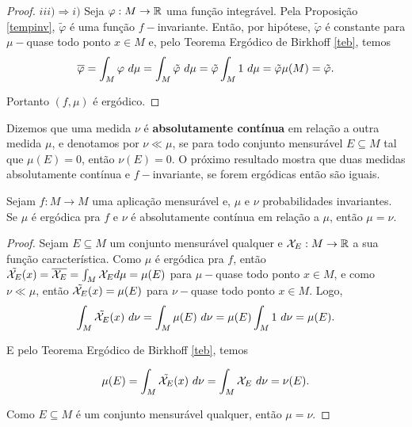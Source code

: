 \begin{proof}
$iii) \Rightarrow i)$ Seja $\varphi:M\to\mathbb{R}$ uma função integrável. Pela Proposição \ref{tempinv}, $\tilde{\varphi}$ é uma função $f-$invariante. Então, por hipótese, $\tilde{\varphi}$ é constante para $\mu-$quase todo ponto $x\in M$ e, pelo Teorema Ergódico de Birkhoff \ref{teb}, temos
\begin{equation*}
\fecho{\varphi}=\int_{M}{\varphi\ d\mu}=\int_{M}{\tilde{\varphi}\ d\mu}=\tilde{\varphi}\int_{M}{1\ d\mu}=\tilde{\varphi}\mu(M)=\tilde{\varphi}.
\end{equation*}

Portanto $(f,\mu)$ é ergódico.
\end{proof}

Dizemos que uma medida $\nu$ é \textbf{absolutamente contínua} em relação a outra medida $\mu$, e denotamos por $\nu\ll\mu$, se para todo conjunto mensurável $E\subseteq M$ tal que $\mu(E)=0$, então $\nu(E)=0$. O próximo resultado mostra que duas medidas absolutamente contínua e $f-$invariante, se forem ergódicas então são iguais.

\begin{proposicao} Sejam $f:M\to M$ uma aplicação mensurável e, $\mu$ e $\nu$ probabilidades invariantes. Se $\mu$ é ergódica pra $f$ e $\nu$ é absolutamente contínua em relação a $\mu$, então $\mu=\nu$.
\end{proposicao}

\begin{proof} Sejam $E\subseteq M$ um conjunto mensurável qualquer e $\mathcal{X}_{E}:M\to\mathbb{R}$ a sua função característica. Como $\mu$ é ergódica pra $f$, então $\tilde{\mathcal{X}_{\text{$E$}}}(x)=\overline{\mathcal{X}_{E}}=\int_{M}{\mathcal{X}_{E}}d\mu=\mu(E)$ para $\mu-$quase todo ponto $x\in M$, e como $\nu\ll\mu$, então $\tilde{\mathcal{X}_{\text{$E$}}}(x)=\mu(E)$ para $\nu-$quase todo ponto $x\in M$. Logo, 
\begin{equation*}
\int_{M}\tilde{\carac{\text{$E$}}}(x)\ d\nu=\int_{M}\mu(E)\ d\nu=\mu(E)\int_{M}1\ d\nu=\mu(E).
\end{equation*}

E pelo Teorema Ergódico de Birkhoff \ref{teb}, temos

\begin{equation*}
\mu(E)=\int_{M}\tilde{\carac{\text{$E$}}}(x)\ d\nu=\int_{M}\carac{E}\ d\nu=\nu(E).
\end{equation*}

Como $E\subseteq M$ é um conjunto mensurável qualquer, então $\mu=\nu$.
\end{proof}

%